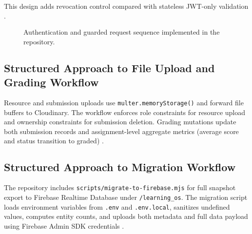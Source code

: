 This design adds revocation control compared with stateless JWT-only validation \cite{repo-security,node-crypto-docs}.

\begin{figure}[h]
\centering
{}
\caption{Authentication and guarded request sequence implemented in the repository.}
\label{fig:auth-sequence}
\end{figure}

\subsection{Structured Approach to File Upload and Grading Workflow}

Resource and submission uploads use \texttt{multer.memoryStorage()} and forward file buffers to Cloudinary. The workflow enforces role constraints for resource upload and ownership constraints for submission deletion. Grading mutations update both submission records and assignment-level aggregate metrics (average score and status transition to graded) \cite{repo-upload,multer-docs,cloudinary-docs}.

\subsection{Structured Approach to Migration Workflow}

The repository includes \texttt{scripts/migrate-to-firebase.mjs} for full snapshot export to Firebase Realtime Database under \texttt{/learning\_os}. The migration script loads environment variables from \texttt{.env} and \texttt{.env.local}, sanitizes undefined values, computes entity counts, and uploads both metadata and full data payload using Firebase Admin SDK credentials \cite{firebase-admin-docs}.
